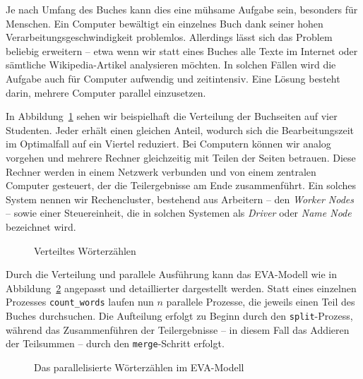 \documentclass[
  letterpaper,
  DIV=11]{scrreprt}
\begin{document}
Je nach Umfang des Buches kann dies eine mühsame Aufgabe sein, besonders
für Menschen. Ein Computer bewältigt ein einzelnes Buch dank seiner
hohen Verarbeitungsgeschwindigkeit problemlos. Allerdings lässt sich das
Problem beliebig erweitern -- etwa wenn wir statt eines Buches alle
Texte im Internet oder sämtliche Wikipedia-Artikel analysieren möchten.
In solchen Fällen wird die Aufgabe auch für Computer aufwendig und
zeitintensiv. Eine Lösung besteht darin, mehrere Computer parallel
einzusetzen.

In Abbildung~\ref{fig-problem-solving-word-count-distributed} sehen wir
beispielhaft die Verteilung der Buchseiten auf vier Studenten. Jeder
erhält einen gleichen Anteil, wodurch sich die Bearbeitungszeit im
Optimalfall auf ein Viertel reduziert. Bei Computern können wir analog
vorgehen und mehrere Rechner gleichzeitig mit Teilen der Seiten
betrauen. Diese Rechner werden in einem Netzwerk verbunden und von einem
zentralen Computer gesteuert, der die Teilergebnisse am Ende
zusammenführt. Ein solches System nennen wir Rechencluster, bestehend
aus Arbeitern -- den \emph{Worker Nodes} -- sowie einer Steuereinheit,
die in solchen Systemen als \emph{Driver} oder \emph{Name Node}
bezeichnet wird.

\begin{figure}


\caption{\label{fig-problem-solving-word-count-distributed}Verteiltes
Wörterzählen}

\end{figure}%

Durch die Verteilung und parallele Ausführung kann das EVA-Modell wie in
Abbildung~\ref{fig-eva-distributed} angepasst und detaillierter
dargestellt werden. Statt eines einzelnen Prozesses
\texttt{count\_words} laufen nun \(n\) parallele Prozesse, die jeweils
einen Teil des Buches durchsuchen. Die Aufteilung erfolgt zu Beginn
durch den \texttt{split}-Prozess, während das Zusammenführen der
Teilergebnisse -- in diesem Fall das Addieren der Teilsummen -- durch
den \texttt{merge}-Schritt erfolgt.

\begin{figure}


\caption{\label{fig-eva-distributed}Das parallelisierte Wörterzählen im
EVA-Modell}

\end{figure}%
\end{document}
